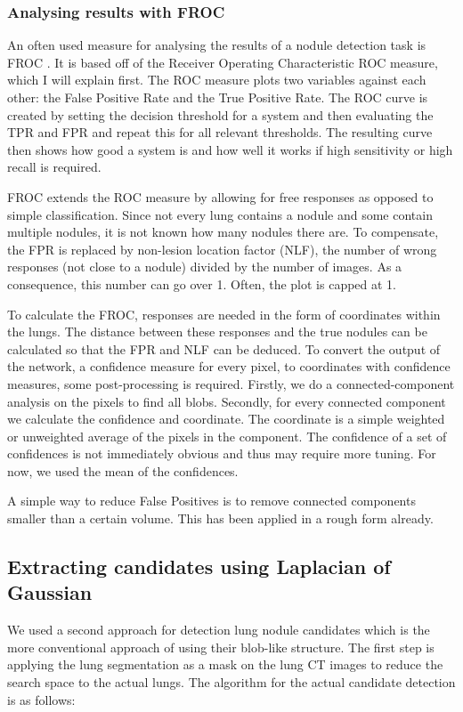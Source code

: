 \documentclass{article}
\begin{document}
\subsubsection{Analysing results with FROC}
An often used measure for analysing the results of a nodule detection task is FROC \cite{froc}. It is based off of the Receiver Operating Characteristic ROC measure, which I will explain first. The ROC measure  plots two variables against each other: the False Positive Rate and the True Positive Rate. The ROC curve is created by setting the decision threshold for a system and then evaluating the TPR and FPR and repeat this for all relevant thresholds. The resulting curve then shows how good a system is and how well it works if high sensitivity or high recall is required.

FROC extends the ROC measure by allowing for free responses as opposed to simple classification. Since not every lung contains a nodule and some contain multiple nodules, it is not known how many nodules there are. To compensate, the FPR is replaced by non-lesion location factor (NLF), the number of wrong responses (not close to a nodule) divided by the number of images. As a consequence, this number can go over 1. Often, the plot is capped at 1.

To calculate the FROC, responses are needed in the form of coordinates within the lungs. The distance between these responses and the true nodules can be calculated so that the FPR and NLF can be deduced. To convert the output of the network, a confidence measure for every pixel, to coordinates with confidence measures, some post-processing is required. Firstly, we do a connected-component analysis on the pixels to find all blobs. Secondly, for every connected component we calculate the confidence and coordinate. The coordinate is a simple weighted or unweighted average of the pixels in the component. The confidence of a set of confidences is not immediately obvious and thus may require more tuning. For now, we used the mean of the confidences.

A simple way to reduce False Positives is to remove connected components smaller than a certain volume. This has been applied in a rough form already.
\subsection{Extracting candidates using Laplacian of Gaussian}
We used a second approach for detection lung nodule candidates which is the more conventional approach of using their blob-like structure. The first step is applying the lung segmentation as a mask on the lung CT images to reduce the search space to the actual lungs. The algorithm for the actual candidate detection is as follows:
\end{document}
